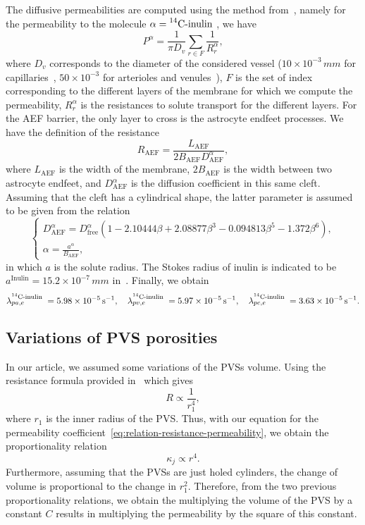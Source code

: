 \documentclass[10pt]{article}
\newcommand{\AP}[1]{\textcolor{blue}{AP: #1}}
\newcommand{\1}{^{(1)}}
\newcommand{\2}{^{(2)}}
\newcommand{\Cinulin}{$\prescript{14}{}{\text{C}}$-inulin }
\begin{document}
The diffusive permeabilities are computed using the method from~\cite{li-2010-BBB}, namely for the permeability to the molecule $\alpha = \text{\Cinulin}$, we have
\[
    P^\alpha = \frac{1}{\pi D_v} \sum_{r \in F} \frac{1}{R_r^\alpha}, 
\]
where $D_v$ corresponds to  the diameter of the considered vessel ($10\times 10^{-3}\, \si{mm}$ for capillaries~\cite{farkas-diam-capillaries}, $50\times 10^{-3}$ for arterioles and venules~\cite{Al-arterial-diam,Nguyen-venule-diam}), $F$ is the set of index corresponding to the different layers of the membrane for which we compute the permeability, $R_r^\alpha$ is the resistances to solute transport for the different layers. 
For the AEF barrier, the only layer to cross is the astrocyte endfeet processes. We have the definition of the resistance 
\[
    R_\text{AEF}= \frac{L_\text{AEF}}{2 B_\text{AEF} D^\alpha_\text{AEF}},
\]
where $L_\text{AEF}$ is the width of the membrane, $2 B_\text{AEF}$ is the width between two astrocyte endfeet, and $ D^\alpha_\text{AEF}$ is the diffusion coefficient in this same cleft. 
Assuming that the cleft has a cylindrical shape, the latter parameter is assumed to be given from the relation~\cite{Michel-1999-permeablity} 
\[
\begin{cases}
D^\alpha_\text{AEF} = D^\alpha_\text{free}\left(1-2.10444\beta +2.08877\beta^3 - 0.094813\beta^5 - 1.372\beta^6 \right),\\
\alpha = \frac{a^\alpha}{B_\text{AEF}},
\end{cases}
\]
in which $a$ is the solute radius. The Stokes radius of inulin is indicated to be $a^\text{Inulin} = 15.2\times 10^{-7} \, \si{mm}$ in~\cite{Schultz-hydro-radii-1961}.
Finally, we obtain 
\[
        \lambda_{pa,e}^\text{\Cinulin} = 5.98\times 10^{-5}\,\si{\second^{-1}}, \quad \lambda_{pv,e}^\text{\Cinulin} = 5.97 \times 10^{-5}\,\si{\second^{-1}}, \quad \lambda_{pc,e}^\text{\Cinulin} = 3.63 \times 10^{-5}\, \si{\second^{-1}}.  
\]

\subsection{Variations of PVS porosities}

In our article, we assumed some variations of the PVSs volume. Using the resistance formula provided in~\cite{Vinje-2020-ICP} which gives 
\[
R \propto \frac{1}{r_1^4},
\]
where $r_1$ is the inner radius of the PVS.  
Thus, with our equation for the permeability coefficient~\eqref{eq:relation-resistance-permeability}, we obtain the proportionality relation 
\[
\kappa_j \propto r^4.
\]
Furthermore, assuming that the PVSs are just holed cylinders, the change of volume is proportional to the change in $r_1^2$. 
Therefore, from the two previous proportionality relations, we obtain the multiplying the volume of the PVS by a constant $C$ results in multiplying the permeability by the square of this constant.  
\end{document}
